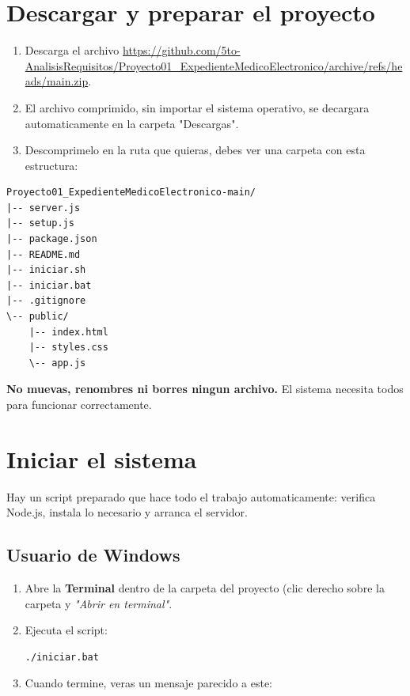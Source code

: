 \documentclass[11pt,a4paper]{article}
\begin{document}
\section{Descargar y preparar el proyecto}

\begin{enumerate}
    \item Descarga el archivo \url{https://github.com/5to-AnalisisRequisitos/Proyecto01_ExpedienteMedicoElectronico/archive/refs/heads/main.zip}.
    \item El archivo comprimido, sin importar el sistema operativo, se decargara automaticamente en la carpeta "Descargas".
    \item Descomprimelo en la ruta que quieras, debes ver una carpeta con esta estructura:
\end{enumerate}

\begin{lstlisting}
Proyecto01_ExpedienteMedicoElectronico-main/
|-- server.js          
|-- setup.js              
|-- package.json        
|-- README.md            
|-- iniciar.sh           
|-- iniciar.bat                 
|-- .gitignore        
\-- public/
    |-- index.html    
    |-- styles.css         
    \-- app.js          
\end{lstlisting}

\begin{cajaCritica}
    \textbf{No muevas, renombres ni borres ningun archivo.} El sistema necesita todos para funcionar correctamente.
\end{cajaCritica}

\section{Iniciar el sistema}

Hay un script preparado que hace todo el trabajo automaticamente: verifica Node.js, instala lo necesario y arranca el servidor.
\subsection{Usuario de Windows}

\begin{enumerate}
    \item Abre la \textbf{Terminal} dentro de la carpeta del proyecto (clic derecho sobre la carpeta y \textit{"Abrir en terminal"}.
    \item Ejecuta el script:
          \begin{lstlisting}
./iniciar.bat
        \end{lstlisting}
    \item Cuando termine, veras un mensaje parecido a este:
\end{enumerate}
\end{document}

